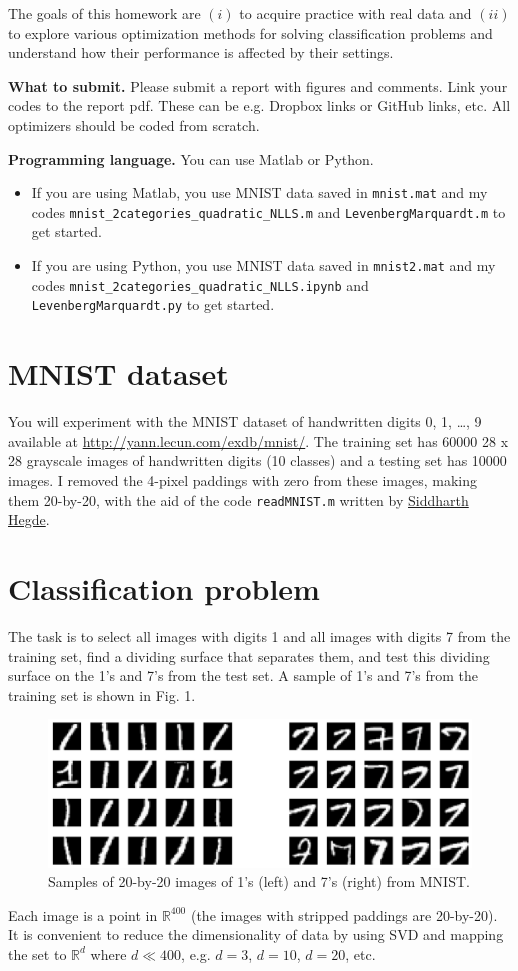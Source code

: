\documentclass{../kin_math}
\begin{document}
The goals of this homework are $(i)$ to acquire practice with real data and $(ii)$ to explore various optimization methods for solving classification problems and understand how their performance is affected by their settings.

\textbf{What to submit.} Please submit a report with figures and comments. Link your codes to the report pdf. These can be e.g. Dropbox links or GitHub links, etc. All optimizers should be coded from scratch.

\textbf{Programming language.} You can use Matlab or Python.
\begin{itemize}
  \item If you are using Matlab, you use MNIST data saved in \texttt{mnist.mat} and my codes \texttt{mnist\_2categories\_quadratic\_NLLS.m} and \texttt{LevenbergMarquardt.m} to get started.
  \item If you are using Python, you use MNIST data saved in \texttt{mnist2.mat} and my codes \texttt{mnist\_2categories\_quadratic\_NLLS.ipynb} and \texttt{LevenbergMarquardt.py} to get started.
\end{itemize}
\section{MNIST dataset}
You will experiment with the MNIST dataset of handwritten digits 0, 1, \dots, 9 available at \url{http://yann.lecun.com/exdb/mnist/}. The training set has 60000 28 x 28 grayscale images of handwritten digits (10 classes) and a testing set has 10000 images. I removed the 4-pixel paddings with zero from these images, making them 20-by-20, with the aid of the code \texttt{readMNIST.m} written by \href{https://www.mathworks.com/matlabcentral/fileexchange/27675-read-digits-and-labels-from-mnist-database}{Siddharth Hegde}.
\section{Classification problem}
The task is to select all images with digits 1 and all images with digits 7 from the training set, find a dividing surface that separates them, and test this dividing surface on the 1's and 7's from the test set. A sample of 1's and 7's from the training set is shown in Fig. 1.
\begin{figure}
  \centering
  \includegraphics[scale=0.5]{mnist.png}
  \caption{Samples of 20-by-20 images of 1's (left) and 7's (right) from MNIST.}
\end{figure}
Each image is a point in $\mathbb{R}^{400}$ (the images with stripped paddings are 20-by-20). It is convenient to reduce the dimensionality of data by using SVD and mapping the set to $\mathbb{R}^d$ where $d \ll 400$, e.g. $d = 3$, $d = 10$, $d = 20$, etc.
\end{document}
